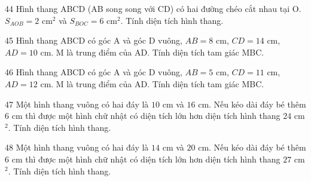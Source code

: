 \gap
\begin{probbox}{44}{}
Hình thang ABCD (AB song song với CD) có hai đường chéo cắt nhau tại O. $S_{AOB}=2$ cm$^2$ và $S_{BOC}=6$ cm$^2$. Tính diện tích hình thang.
\end{probbox}
\gap
\begin{probbox}{45}{}
Hình thang ABCD có góc A và góc D vuông, $AB=8$ cm, $CD=14$ cm, $AD=10$ cm. M là trung điểm của AD. Tính diện tích tam giác MBC.
\end{probbox}
\gap
\begin{probbox}{46}{}
Hình thang ABCD có góc A và góc D vuông, $AB=5$ cm, $CD=11$ cm, $AD=12$ cm. M là trung điểm của AD. Tính diện tích tam giác MBC.
\end{probbox}
\gap
\begin{probbox}{47}{}
Một hình thang vuông có hai đáy là $10$ cm và $16$ cm. Nếu kéo dài đáy bé thêm $6$ cm thì được một hình chữ nhật có diện tích lớn hơn diện tích hình thang $24$ cm$^2$. Tính diện tích hình thang.
\end{probbox}
\gap
\begin{probbox}{48}{}
Một hình thang vuông có hai đáy là $14$ cm và $20$ cm. Nếu kéo dài đáy bé thêm $6$ cm thì được một hình chữ nhật có diện tích lớn hơn diện tích hình thang $27$ cm$^2$. Tính diện tích hình thang.
\end{probbox}
